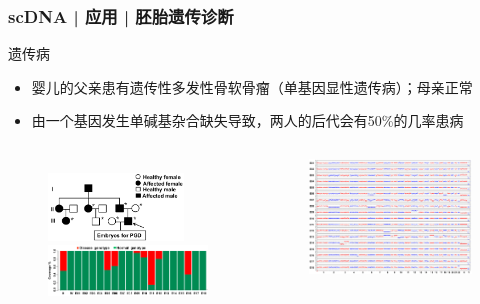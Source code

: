 \documentclass[11pt]{ctexbeamer}
\begin{document}
\begin{frame}
  \frametitle{scDNA | 应用 | 胚胎遗传诊断}
  \begin{block}{遗传病}
    \begin{itemize}
      \item 婴儿的父亲患有遗传性多发性骨软骨瘤（单基因显性遗传病）；母亲正常
      \item 由一个基因发生单碱基杂合缺失导致，两人的后代会有50\%的几率患病
    \end{itemize}
  \end{block}
  \vspace{-0.5em}
  \begin{columns}
  \begin{figure}
    \centering
    \includegraphics[width=0.85\textwidth]{scDNA_baby_A.png}\\ \vspace{0.3em}
    \includegraphics[width=\textwidth]{scDNA_baby_B.png}
  \end{figure}
  \begin{figure}
    \centering
    \includegraphics[width=\textwidth]{scDNA_baby_C.png}
  \end{figure}
  \end{columns}
\end{frame}
\end{document}
